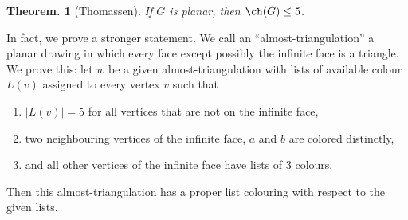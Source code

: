 \documentclass[11pt, a4paper]{memoir}
\theoremstyle{change}
\newtheorem{theorem}{Theorem.}[section]
\theoremstyle{plain}
\theoremstyle{nonumberplain}
\numberwithin{equation}{section}
\begin{document}
\begin{theorem}[Thomassen]
    If $G$ is planar, then $\ch(G)\leq 5$.
\end{theorem}
In fact, we prove a stronger statement.
We call an ``almost-triangulation'' a planar drawing in which every face except possibly the infinite face is a triangle.
We prove this: let $w$ be a given almost-triangulation with lists of available colour $L(v)$ assigned to every vertex $v$ such that
\begin{enumerate}[nl]
    \item $|L(v)|=5$ for all vertices that are not on the infinite face,
    \item two neighbouring vertices of the infinite face, $a$ and $b$ are colored distinctly,
    \item and all other vertices of the infinite face have lists of 3 colours.
\end{enumerate}
Then this almost-triangulation has a proper list colouring with respect to the given lists.
\end{document}
